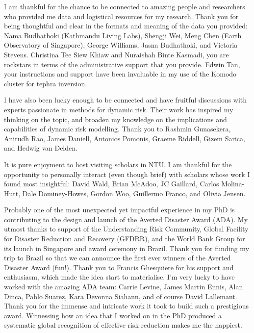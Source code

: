 {I am thankful for the chance to be connected to amazing people and researchers who provided me data and logistical resources for my research. Thank you for being thoughtful and clear in the formats and meaning of the data you provided: Nama Budhathoki (Kathmandu Living Labs), Shengji Wei, Meng Chen (Earth Observatory of Singapore), George Williams, Jasna Budhathoki, and Victoria Stevens. Christina Tee Siew Khiaw and Nuraishah Binte Kasmadi, you are rockstars in terms of the administrative support that you provide. Edwin Tan, your instructions and support have been invaluable in my use of the Komodo cluster for tephra inversion.


I have also been lucky enough to be connected and have fruitful discussions with experts passionate in methods for dynamic risk. Their work has inspired my thinking on the topic, and broaden my knowledge on the implications and capabilities of dynamic risk modelling. Thank you to Rashmin Gunasekera, Anirudh Rao, James Daniell, Antonios Pomonis, Graeme Riddell, Gizem Sarica, and Hedwig van Delden.

It is pure enjoyment to host visiting scholars in NTU. I am thankful for the opportunity to personally interact (even though brief) with scholars whose work I found most insightful: David Wald, Brian McAdoo, JC Gaillard, Carlos Molina-Hutt, Dale Dominey-Howes, Gordon Woo, Guillermo Franco, and Olivia Jensen.

Probably one of the most unexpected yet impactful experience in my PhD is contributing to the design and launch of the Averted Disaster Award (ADA). My utmost thanks to support of the Understanding Risk Community, Global Facility for Disaster Reduction and Recovery (GFDRR), and the World Bank Group for its launch in Singapore and award ceremony in Brazil. Thank you for funding my trip to Brazil so that we can announce the first ever winners of the Averted Disaster Award (fun!). Thank you to Francis Ghesquiere for his support and enthusiasm, which made the idea start to materialise. I'm very lucky to have worked with the amazing ADA team: Carrie Levine, James Martin Ennis, Alan Dinca, Pablo Suarez, Kara Devonna Siahann, and of course David Lallemant. Thank you for the immense and intricate work it took to build such a prestigious award. Witnessing how an idea that I worked on in the PhD produced a systematic global recognition of effective risk reduction makes me the happiest.

}
